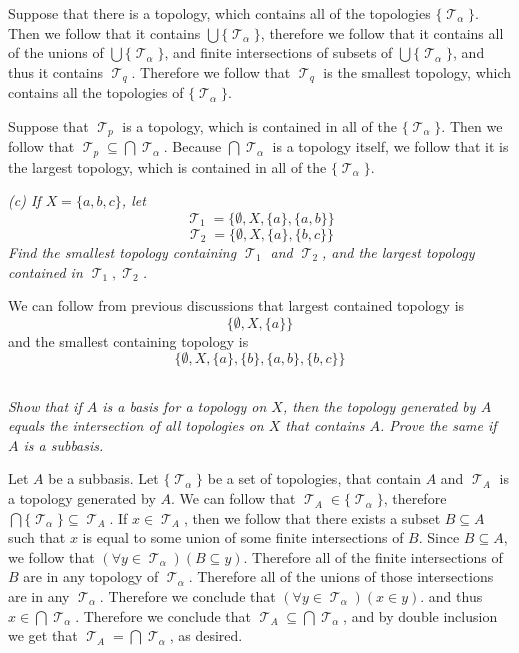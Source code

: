 \documentclass[11pt,oneside,titlepage]{book}
\DeclareMathOperator \topol {\mathcal {T}}
\newcommand{\set}[1]{\{ #1 \}}
\begin{document}
Suppose that there is a topology, which contains
all of the topologies $\set{\topol_\alpha}$. Then we follow that it contains
$\bigcup{\set{\topol_\alpha}}$, therefore we follow that it contains all of the unions
of $\bigcup{\set{\topol_\alpha}}$, and finite intersections of subsets of
$\bigcup{\set{\topol_\alpha}}$, and thus it contains $\topol_q$. Therefore
we follow that $\topol_q$ is the smallest topology, which contains all
the topologies of $\set{\topol_\alpha}$.

Suppose that $\topol_p$ is a topology, which is contained in all of the $\set{\topol_\alpha}$.
Then we follow that $\topol_p \subseteq \bigcap{\topol_\alpha}$. Because $\bigcap{\topol_\alpha}$
is a topology itself, we follow that it is the largest topology, which is contained
in all of the $\set{\topol_\alpha}$.

\textit{(c) If $X = \set{a, b, c}$, let
  $$\topol_1 = \set{\emptyset, X, \set{a}, \set{a, b}}$$
  $$\topol_2 = \set{\emptyset, X, \set{a}, \set{b, c}}$$
  Find the smallest topology containing $\topol_1$ and $\topol_2$, and the largest topology
  contained in $\topol_1, \topol_2$.
}

We can follow from previous discussions that largest contained topology is
$$\set{\emptyset, X, \set{a}}$$
and the smallest containing topology is
$$\set{\emptyset, X, \set{a}, \set{b}, \set{a, b}, \set{b, c}}$$

\subsection{}

\textit{Show that if $A$ is a basis for a topology on $X$, then the topology generated by $A$
  equals the intersection of all topologies on $X$ that contains $A$. Prove the same
  if $A$ is a subbasis.}

Let $A$ be a subbasis.
Let $\set{\topol_\alpha}$ be a set of topologies, that contain $A$ and  $\topol_A$ is
a topology generated by $A$. We can follow that $\topol_A \in \set{\topol_\alpha}$,
therefore $\bigcap{\set{\topol_\alpha}} \subseteq {\topol_A}$. If $x \in \topol_A$, then we
follow that there exists a subset $B \subseteq A$ such that $x$ is equal to some
union of some finite intersections of $B$. Since
$B \subseteq A$, we follow that $(\forall y \in \topol_\alpha)(B \subseteq y)$. Therefore
all of the finite intersections of $B$ are in any topology of $\topol_\alpha$.  Therefore
all of the unions of those intersections are in any $\topol_\alpha$. Therefore
we conclude that $(\forall y \in \topol_\alpha)(x \in y)$.
and thus $x \in \bigcap{\topol_\alpha}$.
Therefore we conclude that $\topol_A \subseteq  \bigcap{\topol_\alpha}$, and by double
inclusion we get that $\topol_A =  \bigcap{\topol_\alpha}$, as desired.
\end{document}
